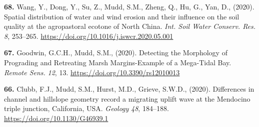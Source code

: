 \documentclass[10pt, a4paper]{article}
\newcommand{\years}[1]{\marginnote{\scriptsize #1}}
\begin{document}
\years{2020}\hangindent=0.7cm\textbf{68. }Wang, Y., Dong, Y., Su, Z., Mudd, S.M., Zheng, Q., Hu, G., Yan, D., (2020). Spatial distribution of water and wind erosion and their influence on the soil quality at the agropastoral ecotone of North China. \textit{Int. Soil Water Conserv. Res.} \textit{8}, 253–265. \href{https://doi.org/10.1016/j.iswcr.2020.05.001}{https://doi.org/10.1016/j.iswcr.2020.05.001}\par
\years{2020}\hangindent=0.7cm\textbf{67. }Goodwin, G.C.H., Mudd, S.M., (2020). Detecting the Morphology of Prograding and Retreating Marsh Margins-Example of a Mega-Tidal Bay. \textit{Remote Sens.} \textit{12}, 13. \href{https://doi.org/10.3390/rs12010013}{https://doi.org/10.3390/rs12010013}\par
\years{2020}\hangindent=0.7cm\textbf{66. }Clubb, F.J., Mudd, S.M., Hurst, M.D., Grieve, S.W.D., (2020). Differences in channel and hillslope geometry record a migrating uplift wave at the Mendocino triple junction, California, USA. \textit{Geology} \textit{48}, 184–188. \href{https://doi.org/10.1130/G46939.1}{https://doi.org/10.1130/G46939.1}\par
\end{document}
